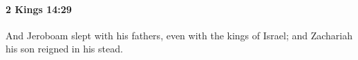
		\paragraph{2 Kings 14:29} %
			\label{2KINGS-14-29}

			And Jeroboam slept with his fathers, even with the kings of Israel; and Zachariah his son reigned in his stead.

